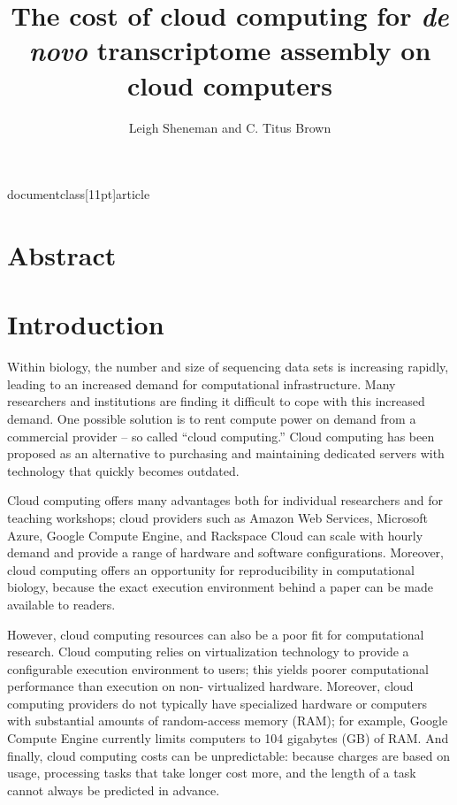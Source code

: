 documentclass[11pt]{article}



\title{The cost of cloud computing for {\em de novo} transcriptome assembly on cloud computers}
\author{Leigh Sheneman and C. Titus Brown}
\maketitle

\section*{Abstract}

\section*{Introduction}

Within biology, the number and size of sequencing data sets is
increasing rapidly, leading to an increased demand for computational
infrastructure. Many researchers and institutions are finding it
difficult to cope with this increased demand.  One possible solution
is to rent compute power on demand from a commercial provider -- so
called ``cloud computing.'' Cloud computing has been proposed as an
alternative to purchasing and  maintaining dedicated servers with
technology that quickly becomes outdated.

Cloud computing offers many advantages both for individual researchers
and for teaching workshops; cloud providers such as Amazon Web
Services, Microsoft Azure, Google Compute Engine, and Rackspace Cloud
can scale with hourly demand and provide a range of hardware and
software configurations.  Moreover, cloud computing offers an
opportunity for reproducibility in computational biology, because the
exact execution environment behind a paper can be made available to
readers.

However, cloud computing resources can also be a poor fit for
computational research.  Cloud computing relies on virtualization
technology to provide a configurable execution environment to users;
this yields poorer computational performance than execution on non-
virtualized hardware.  Moreover, cloud computing providers do not
typically have specialized hardware or computers with substantial
amounts of random-access memory (RAM); for example, Google Compute
Engine currently limits computers to 104 gigabytes (GB) of RAM. And
finally, cloud computing costs can be unpredictable: because charges
are based on usage, processing tasks that take longer cost more, and
the length of a task cannot always be predicted in advance.

